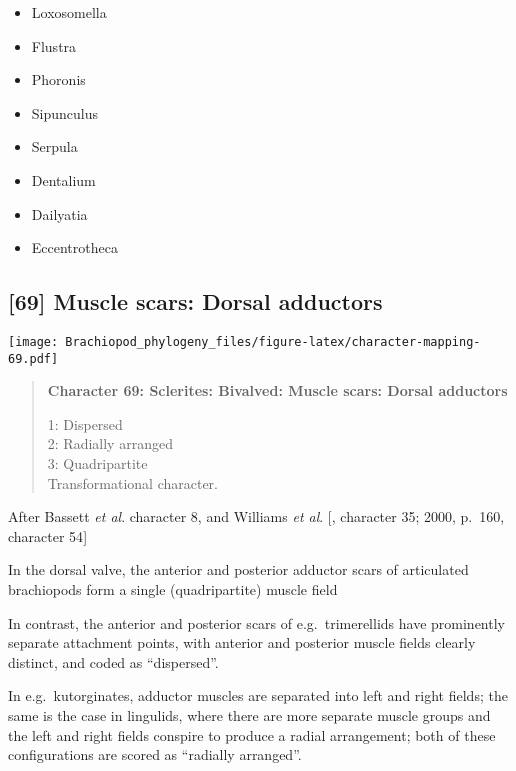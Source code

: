 \documentclass[openany]{book}
\providecommand{\tightlist}{%
  \setlength{\itemsep}{0pt}\setlength{\parskip}{0pt}}
\theoremstyle{definition}
\theoremstyle{definition}
\theoremstyle{definition}
\theoremstyle{remark}
\begin{document}
\begin{itemize}
\tightlist
\item
  Loxosomella\\
\item
  Flustra\\
\item
  Phoronis\\
\item
  Sipunculus\\
\item
  Serpula\\
\item
  Dentalium\\
\item
  Dailyatia\\
\item
  Eccentrotheca
\end{itemize}

\subsection*{{[}69{]} Muscle scars: Dorsal
adductors}\label{muscle-scars-dorsal-adductors}

\texttt{[image: Brachiopod\_phylogeny\_files/figure-latex/character-mapping-69.pdf]}

\begin{quote}
\textbf{Character 69: Sclerites: Bivalved: Muscle scars: Dorsal
adductors}

1: Dispersed\\
2: Radially arranged\\
3: Quadripartite\\
Transformational character.
\end{quote}

After Bassett \emph{et al}.
\citeyearpar{Bassett2001Functionalmorphology} character 8, and Williams
\emph{et al}. {[}\citet{Williams1996Asupra}, character 35; 2000, p.~160,
character 54{]}

In the dorsal valve, the anterior and posterior adductor scars of
articulated brachiopods form a single (quadripartite) muscle field
\citep[p.~201]{Williams2000LinguliformeaCraniiformea}

In contrast, the anterior and posterior scars of e.g.~trimerellids have
prominently separate attachment points, with anterior and posterior
muscle fields clearly distinct, and coded as ``dispersed''.

In e.g.~kutorginates, adductor muscles are separated into left and right
fields; the same is the case in lingulids, where there are more separate
muscle groups and the left and right fields conspire to produce a radial
arrangement; both of these configurations are scored as ``radially
arranged''.
\end{document}
